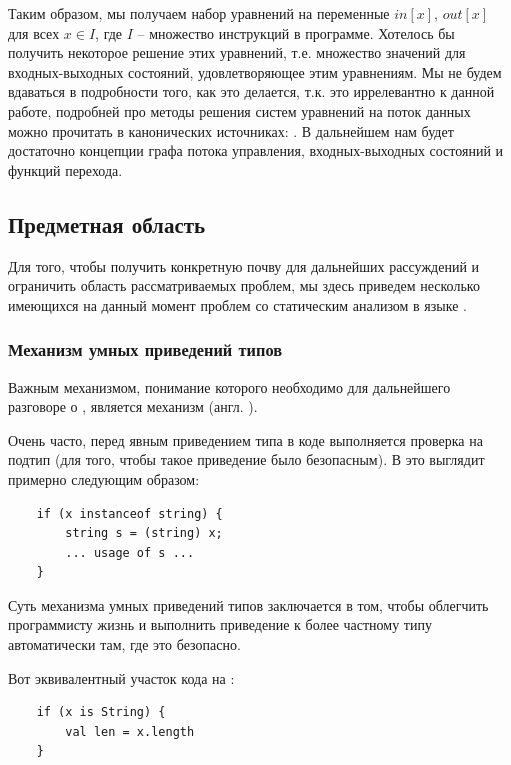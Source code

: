 Таким образом, мы получаем набор уравнений на переменные $in[x]$, $out[x]$ для всех $x \in I$, где $I$ -- множество инструкций в программе. Хотелось бы получить некоторое решение этих уравнений, т.е. множество значений для входных-выходных состояний, удовлетворяющее этим уравнениям. Мы не будем вдаваться в подробности того, как это делается, т.к. это иррелевантно к данной работе, подробней про методы решения систем уравнений на поток данных можно прочитать в канонических источниках: \cite{dragon-book, muchnick}. В дальнейшем нам будет достаточно концепции графа потока управления, входных-выходных состояний и функций перехода.



\newpage

\subsection{Предметная область}

Для того, чтобы получить конкретную почву для дальнейших рассуждений и ограничить область рассматриваемых проблем, мы здесь приведем несколько имеющихся на данный момент проблем со статическим анализом в языке . 



\subsubsection{Механизм умных приведений типов}

Важным механизмом, понимание которого необходимо для дальнейшего разговоре о , является механизм  (англ. ). 

Очень часто, перед явным приведением типа в коде выполняется проверка на подтип (для того, чтобы такое приведение было безопасным). В  это выглядит примерно следующим образом:

\begin{verbatim}
    if (x instanceof string) {
        string s = (string) x;
        ... usage of s ...
    }
\end{verbatim}

Суть механизма умных приведений типов заключается в том, чтобы облегчить программисту жизнь и выполнить приведение к более частному типу автоматически там, где это безопасно. 

Вот эквивалентный участок кода на : 

\begin{verbatim}
    if (x is String) {
        val len = x.length
    }
\end{verbatim}

